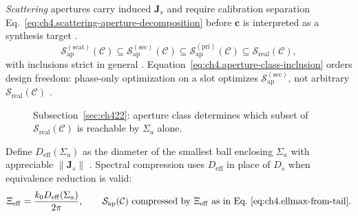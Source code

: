 \emph{Scattering} apertures carry induced \(\mathbf{J}_{s}\) and require calibration separation
Eq.~\eqref{eq:ch4.scattering-aperture-decomposition} before \(\mathbf{c}\) is interpreted as a synthesis target
\cite{stratton1941}.
\begin{equation}
\label{eq:ch4.aperture-class-inclusion}
\mathcal{S}_{\mathrm{ap}}^{\mathrm{(scat)}}(\mathcal{C})
\subseteq
\mathcal{S}_{\mathrm{ap}}^{\mathrm{(sec)}}(\mathcal{C})
\subseteq
\mathcal{S}_{\mathrm{ap}}^{\mathrm{(pri)}}(\mathcal{C})
\subseteq
\mathcal{S}_{\mathrm{real}}(\mathcal{C}),
\end{equation}
with inclusions strict in general \cite{collin2001}. Equation~\eqref{eq:ch4.aperture-class-inclusion} orders
design freedom: phase-only optimization on a slot optimizes \(\mathcal{S}_{\mathrm{ap}}^{\mathrm{(sec)}}\), not arbitrary
\(\mathcal{S}_{\mathrm{real}}(\mathcal{C})\) \cite{devaney2004}.
\begin{figure}[t]
\centering
{}
\caption{Subsection~\ref{sec:ch422}: aperture class determines which subset of
\(\mathcal{S}_{\mathrm{real}}(\mathcal{C})\) is reachable by \(\Sigma_{a}\) alone.}
\label{fig:ch4.aperture-taxonomy}
\end{figure}
Define \(D_{\mathrm{eff}}(\Sigma_{a})\) as the diameter of the smallest ball enclosing \(\Sigma_{a}\) with appreciable
\(\|\mathbf{J}_{s}\|\) \cite{collin2001}. Spectral compression uses \(D_{\mathrm{eff}}\) in place of
\(D_{s}\) when equivalence reduction is valid:
\begin{equation}
\label{eq:ch4.effective-aperture-size}
\Xi_{\mathrm{eff}}
=
\frac{k_{0}D_{\mathrm{eff}}(\Sigma_{a})}{2\pi},
\qquad
\mathcal{S}_{\mathrm{ap}}(\mathcal{C})
\ \text{compressed by}\ 
\Xi_{\mathrm{eff}}
\ \text{as in}\ 
\text{Eq.~\eqref{eq:ch4.ellmax-from-tail}}.
\end{equation}
